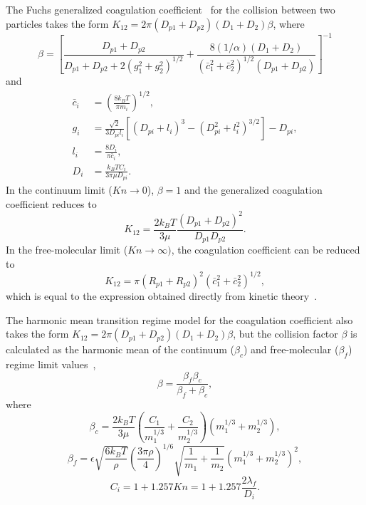 \documentclass[preprint,letterpaper]{elsarticle}
\begin{document}
The Fuchs generalized coagulation coefficient~\cite{Fuchs_1964} for the collision between two particles takes the form $K_{12}=2\pi (D_{p1}+D_{p2})(D_1+D_2)\beta$, where
\begin{equation}
    \beta = \left[ \frac{D_{p1}+D_{p2}}{D_{p1}+D_{p2}+2(g_1^2+g_2^2)^{1/2}} + \frac{8(1/\alpha)(D_1+D_2)}{(\bar{c}_1^2+\bar{c}_2^2)^{1/2}(D_{p1}+D_{p2})} \right]^{-1}
\end{equation}
and
\begin{align}
    \bar{c}_i &= \left( \frac{8k_B T}{\pi m_i} \right)^{1/2}, \\
    g_i &= \frac{\sqrt{2}}{3D_{pi}l_i} \left[ (D_{pi}+l_i)^3 - (D_{pi}^2+l_i^2)^{3/2} \right] - D_{pi}, \\
    l_i &= \frac{8D_i}{\pi \bar{c}_i}, \\
    D_i &= \frac{k_B T C_i}{3\pi \mu D_{pi}}.
\end{align}
In the continuum limit ($Kn \rightarrow 0$), $\beta=1$ and the generalized coagulation coefficient reduces to
\begin{equation}
    K_{12}=\frac{2k_BT}{3\mu} \frac{(D_{p1}+D_{p2})^2}{D_{p1}D_{p2}}.
\end{equation}
In the free-molecular limit ($Kn \rightarrow \infty)$, the coagulation coefficient can be reduced to
\begin{equation}
    K_{12} = \pi (R_{p1}+R_{p2})^2 (\bar{c}_1^2 + \bar{c}_2^2)^{1/2},
\end{equation}
which is equal to the expression obtained directly from kinetic theory~\cite{Seinfeld_2016}.

The harmonic mean transition regime model for the coagulation coefficient also takes the form $K_{12}=2\pi (D_{p1}+D_{p2})(D_1+D_2)\beta$, but the collision factor $\beta$ is calculated as the harmonic mean of the continuum ($\beta_c$) and free-molecular ($\beta_f$) regime limit values~\cite{Frenklach_2002b},
\begin{equation}
    \beta = \frac{\beta_f \beta_c}{\beta_f + \beta_c},
\end{equation}
where
\begin{equation}
    \beta_c = \frac{2k_BT}{3 \mu} \left( \frac{C_1}{m_1^{1/3}} + \frac{C_2}{m_2^{1/3}} \right) (m_1^{1/3}+m_2^{1/3}),
\end{equation}
\begin{equation}
    \beta_f = \epsilon \sqrt{\frac{6k_BT}{\rho}} \left( \frac{3\pi \rho}{4} \right)^{1/6} \sqrt{\frac{1}{m_1}+\frac{1}{m_2}} (m_1^{1/3}+m_2^{1/3})^2,
\end{equation}
\begin{equation}
    C_i = 1 + 1.257Kn = 1 + 1.257 \frac{2\lambda_f}{D_i}.
\end{equation}
\end{document}
